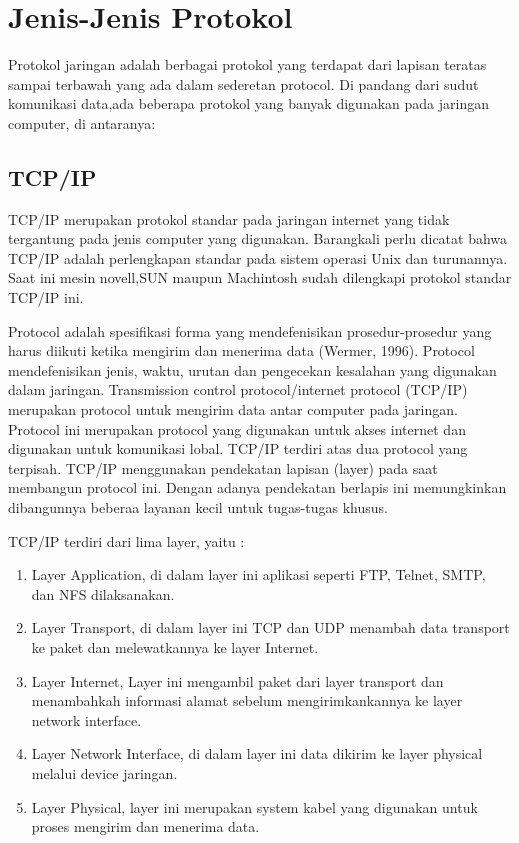  \section{Jenis-Jenis Protokol}
Protokol jaringan adalah berbagai protokol yang terdapat dari lapisan  teratas sampai terbawah yang ada dalam sederetan protocol.
Di pandang dari sudut komunikasi data,ada beberapa protokol yang banyak digunakan pada jaringan computer, di antaranya:

 \subsection{TCP/IP}
TCP/IP merupakan protokol standar pada jaringan internet yang tidak tergantung pada jenis computer yang digunakan.
Barangkali perlu dicatat bahwa TCP/IP adalah perlengkapan standar pada sistem operasi Unix dan turunannya.
Saat ini mesin novell,SUN maupun Machintosh sudah dilengkapi protokol standar TCP/IP ini.

Protocol adalah spesifikasi forma yang mendefenisikan prosedur-prosedur yang harus diikuti ketika mengirim dan menerima data (Wermer, 
1996). Protocol mendefenisikan jenis, waktu, urutan dan pengecekan kesalahan yang digunakan dalam jaringan. Transmission control 
protocol/internet protocol (TCP/IP) merupakan protocol untuk mengirim data antar computer pada jaringan. Protocol ini merupakan protocol 
yang digunakan untuk akses internet dan digunakan untuk komunikasi lobal. TCP/IP terdiri atas dua protocol yang terpisah. TCP/IP 
menggunakan pendekatan lapisan (layer) pada saat membangun protocol ini. Dengan adanya pendekatan berlapis ini memungkinkan dibangunnya 
beberaa layanan kecil untuk tugas-tugas khusus.

TCP/IP terdiri dari lima layer, yaitu :
\begin{enumerate}
\item   Layer Application, di dalam layer ini aplikasi seperti FTP, Telnet, SMTP, dan NFS dilaksanakan.
\item   Layer Transport, di dalam layer ini TCP dan UDP menambah data transport ke paket dan melewatkannya ke layer Internet.
\item    Layer Internet, Layer ini mengambil paket dari layer transport dan menambahkah informasi alamat sebelum mengirimkankannya ke layer network interface.
\item     Layer Network Interface, di dalam layer ini data dikirim ke layer physical melalui device jaringan.
\item     Layer Physical, layer ini merupakan system kabel yang digunakan untuk proses mengirim dan menerima data.
\end{enumerate}

